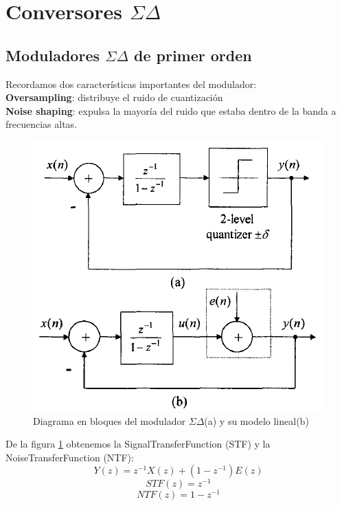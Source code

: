 \documentclass[assd_tp3_main.tex]{subfiles}
\begin{document}
\section{Conversores $\Sigma\Delta$}
\subsection{Moduladores $\Sigma\Delta$ de primer orden }
Recordamos dos características importantes del modulador:\\
\textbf{Oversampling}: distribuye el ruido de cuantización \\
\textbf{Noise shaping}: expulsa la mayoría del ruido que estaba dentro de la banda a frecuencias altas. 

\begin{figure}[H]
\centering
\includegraphics[width=0.4\linewidth]{images/ej4/sd_linmodel.png}
\caption{Diagrama en bloques del modulador $\Sigma\Delta$(a) y su modelo lineal(b)}
\label{fig:sigmadelmod_model}
\end{figure}
De la figura \ref{fig:sigmadelmod_model} obtenemos la SignalTransferFunction (STF) y la NoiseTransferFunction (NTF):
\[ Y(z)= z^{-1}X(z)+(1-z^{-1})E(z) \]
\[ STF(z)= z^{-1} \]
\[ NTF(z)= 1-z^{-1} \]
\end{document}
